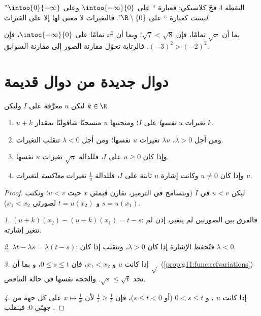 \begin{remark}
النقطة 4 فخّ كلاسيكي: فعبارة `` على $\intoo{-\infty}{0}$ وعلى
$\intoo{0}{+\infty}$'' \emph{ليست} كعبارة `` على
$\R \setminus \{0\}$''. فالتغيرات لا معنى لها إلا على الفترات.
\end{remark}

\begin{example}
بما أن $\sqrt x$  تمامًا، فإن $\sqrt{7} < \sqrt{8}$؛ وبما أن
$x^2$  تمامًا على $\intoc{-\infty}{0}$، فإن
$(-3)^2 > (-2)^2$. فالرتابة تحوّل مقارنة الصور إلى
مقارنة السوابق.
\end{example}

\section{دوال جديدة من دوال قديمة}

\begin{proposition}[التحويلات]\label{prop:g11:func:transforms}
لتكن $u$  معرَّفة على  $I$ وليكن $k \in \R$.
\begin{enumerate}
  \item {} $u + k$ تغيرات $u$ \emph{نفسها} على $I$؛ ومنحنيها
         $u$ منسحبًا شاقوليًا بمقدار $k$.
  \item ومن أجل $\lambda > 0$،  $\lambda u$ تغيرات $u$ نفسها؛ ومن أجل
        $\lambda < 0$ تنقلب التغيرات.
  \item وإذا كان $u \geq 0$ على $I$، فللدالة $\sqrt u$ تغيرات
        $u$ نفسها.
  \item وإذا كان $u \neq 0$ وكانت إشارة $u$ ثابتة على $I$، فللدالة $\frac1u$
        تغيرات \emph{معاكسة} لتغيرات $u$.
\end{enumerate}
\end{proposition}

\begin{proof}
ليكن $u < v$ في $I$ (وبتسامح في الترميز، نقارن قيمتَي $x$ حيث $u < v$؛ ونكتب
$s = u(x_1)$ و $t = u(x_2)$ لصورتَي $x_1 < x_2$).

\emph{1.} $(u+k)(x_2) - (u+k)(x_1) = t - s$: فالفرق بين الصورتين
لم يتغير، إذن لم تتغير إشارته.

\emph{2.} $\lambda t - \lambda s = \lambda(t - s)$: فتُحفظ الإشارة إذا كان
$\lambda > 0$، وتنقلب إذا كان $\lambda < 0$.

\emph{3.} إذا كانت $u$  و $x_1 < x_2$، فإن $0 \leq s \leq t$، و
بما أن $\sqrt{}$  (\cref{prop:g11:func:refvariations}) نجد
$\sqrt s \leq \sqrt t$. والحجة نفسها في حالة التناقص.

\emph{4.} إذا كانت $u$ ، و $0 < s \leq t$ (أو $s \leq t < 0$)، فإن
$\frac1s \geq \frac1t$ لأن $x \mapsto \frac1x$  على كل
جهة من جهتَي $0$: فينقلب .
\end{proof}

